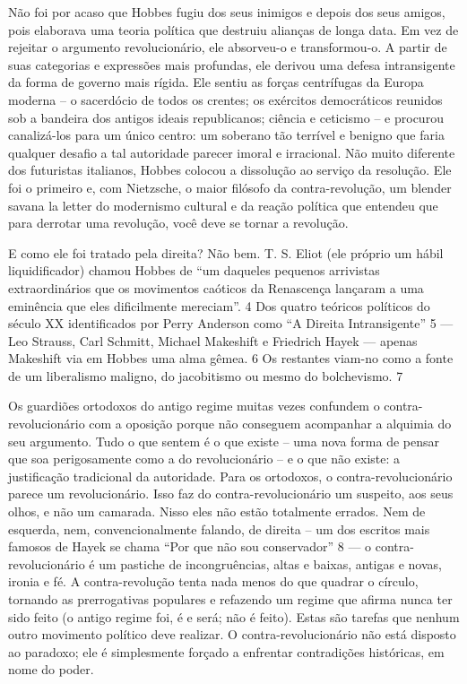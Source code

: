  
\par
 
Não foi por acaso que Hobbes fugiu dos seus inimigos e depois dos seus amigos, pois elaborava uma teoria política que destruiu alianças de longa data. Em vez de rejeitar o argumento revolucionário, ele absorveu-o e transformou-o. A partir de suas categorias e expressões mais profundas, ele derivou uma defesa intransigente da forma de governo mais rígida. Ele sentiu as forças centrífugas da Europa moderna – o sacerdócio de todos os crentes; os exércitos democráticos reunidos sob a bandeira dos antigos ideais republicanos; ciência e ceticismo – e procurou canalizá-los para um único centro: um soberano tão terrível e benigno que faria qualquer desafio a tal autoridade parecer imoral e irracional. Não muito diferente dos futuristas italianos, Hobbes colocou a dissolução ao serviço da resolução. Ele foi o primeiro e, com Nietzsche, o maior filósofo da contra-revolução, um blender savana la letter do modernismo cultural e da reação política que entendeu que para derrotar uma revolução, você deve se tornar a revolução.
 
\par
 
E como ele foi tratado pela direita? Não bem. T. S. Eliot (ele próprio um hábil liquidificador) chamou Hobbes de “um daqueles pequenos arrivistas extraordinários que os movimentos caóticos da Renascença lançaram a uma eminência que eles dificilmente mereciam”.
 {\color{blue} 4}  
Dos quatro teóricos políticos do século XX identificados por Perry Anderson como “A Direita Intransigente”
 {\color{blue} 5}  
— Leo Strauss, Carl Schmitt, Michael Makeshift e Friedrich Hayek — apenas Makeshift via em Hobbes uma alma gêmea.
 {\color{blue} 6}  
Os restantes viam-no como a fonte de um liberalismo maligno, do jacobitismo ou mesmo do bolchevismo.
 {\color{blue} 7}  

 
\par
 
Os guardiões ortodoxos do antigo regime muitas vezes confundem o contra-revolucionário com a oposição porque não conseguem acompanhar a alquimia do seu argumento. Tudo o que sentem é o que existe – uma nova forma de pensar que soa perigosamente como a do revolucionário – e o que não existe: a justificação tradicional da autoridade. Para os ortodoxos, o contra-revolucionário parece um revolucionário. Isso faz do contra-revolucionário um suspeito, aos seus olhos, e não um camarada. Nisso eles não estão totalmente errados. Nem de esquerda, nem, convencionalmente falando, de direita – um dos escritos mais famosos de Hayek se chama “Por que não sou conservador”
 {\color{blue} 8}  
— o contra-revolucionário é um pastiche de incongruências, altas e baixas, antigas e novas, ironia e fé. A contra-revolução tenta nada menos do que quadrar o círculo, tornando as prerrogativas populares e refazendo um regime que afirma nunca ter sido feito (o antigo regime foi, é e será; não é feito). Estas são tarefas que nenhum outro movimento político deve realizar. O contra-revolucionário não está disposto ao paradoxo; ele é simplesmente forçado a enfrentar contradições históricas, em nome do poder.
 
